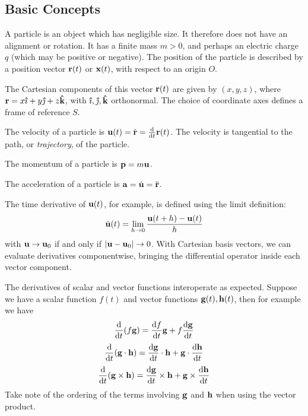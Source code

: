 \subsection{Basic Concepts}
\begin{definition}
	A particle is an object which has negligible size. It therefore does not have an alignment or rotation. It has a finite mass \(m > 0\), and perhaps an electric charge \(q\) (which may be positive or negative). The position of the particle is described by a position vector \(\vb r(t)\) or \(\vb x(t)\), with respect to an origin \(O\).
\end{definition}
\begin{definition}
	The Cartesian components of this vector \(\vb r(t)\) are given by \((x, y, z)\), where \(\vb r = x \vu{\imath} + y \vu{\jmath} + z \vu{k}\), with \(\vu{\imath}, \vu{\jmath}, \vu{k}\) orthonormal. The choice of coordinate axes defines a frame of reference \(S\).
\end{definition}
\begin{definition}
	The velocity of a particle is \(\vb u(t) = \dot{\vb r} = \frac{\dd}{\dd{t}}\vb r(t)\). The velocity is tangential to the path, or \textit{trajectory}, of the particle.
\end{definition}
\begin{definition}
	The momentum of a particle is \(\vb p = m \vb u\).
\end{definition}
\begin{definition}
	The acceleration of a particle is \(\vb a = \dot{\vb u} = \ddot{\vb r}\).
\end{definition}
\begin{note}
	The time derivative of \(\vb u(t)\), for example, is defined using the limit definition:
	\[ \dot{\vb u}(t) = \lim_{h \to 0} \frac{\vb u(t + h) - \vb u(t)}{h} \]
	with \(\vb u \to \vb u_0\) if and only if \(\abs{\vb u - \vb u_0} \to 0\). With Cartesian basis vectors, we can evaluate derivatives componentwise, bringing the differential operator inside each vector component.
\end{note}
The derivatives of scalar and vector functions interoperate as expected. Suppose we have a scalar function \(f(t)\) and vector functions \(\vb g(t), \vb h(t)\), then for example we have
\[ \frac{\dd}{\dd{t}}(f \vb g) = \frac{\dd{f}}{\dd{t}} \vb g + f \frac{\dd \vb g}{\dd{t}} \]
\[ \frac{\dd}{\dd{t}}(\vb g \cdot \vb h) = \frac{\dd \vb g}{\dd{t}}\cdot \vb h + \vb g \cdot \frac{\dd \vb h}{\dd{t}} \]
\[ \frac{\dd}{\dd{t}}(\vb g \times \vb h) = \frac{\dd \vb g}{\dd{t}}\times \vb h + \vb g \times \frac{\dd \vb h}{\dd{t}} \]
Take note of the ordering of the terms involving \(\vb g\) and \(\vb h\) when using the vector product.

